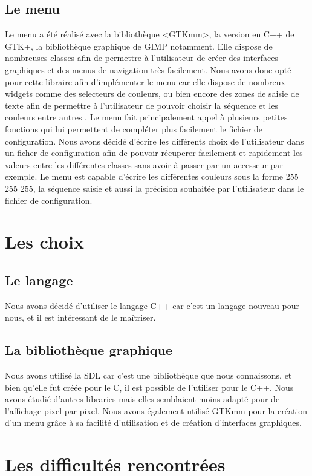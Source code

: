 \documentclass{article}
\begin{document}
	\subsection{Le menu}
	Le menu a été réalisé avec la bibliothèque <GTKmm>, la version en C++ de GTK+, la bibliothèque graphique de GIMP notamment.
	Elle dispose de nombreuses classes afin de permettre à l'utilisateur de créer des interfaces graphiques et des menus de navigation très facilement.
	Nous avons donc opté pour cette libraire afin d'implémenter le menu car elle dispose de nombreux widgets comme des selecteurs de couleurs, ou bien encore des zones de saisie de texte afin de permettre à l'utilisateur de pouvoir choisir la séquence et les couleurs entre autres .
	Le menu fait principalement appel à plusieurs petites fonctions qui lui permettent de compléter plus facilement le fichier de configuration.
	Nous avons décidé d'écrire les différents choix de l'utilisateur dans un ficher de configuration afin de pouvoir récuperer facilement et rapidement les valeurs entre les différentes classes sans avoir à passer par un accesseur par exemple.
	Le menu est capable d'écrire les différentes couleurs sous la forme 255 255 255, la séquence saisie et aussi la précision souhaitée par l'utilisateur dans le fichier de configuration.

	\section{Les choix}

	\subsection{Le langage}
	Nous avons décidé d'utiliser le langage C++ car c'est un langage nouveau pour nous, et il est intéressant de le maîtriser.

	\subsection{La bibliothèque graphique}
	Nous avons utilisé la SDL car c'est une bibliothèque que nous connaissons, et bien qu'elle fut créée pour le C, il est possible de l'utiliser pour le C++.
	Nous avons étudié d'autres libraries mais elles semblaient moins adapté pour de l'affichage pixel par pixel.
	Nous avons également utilisé GTKmm pour la création d'un menu grâce à sa facilité d'utilisation et de création d'interfaces graphiques.

	\section{Les difficultés rencontrées}
\end{document}
